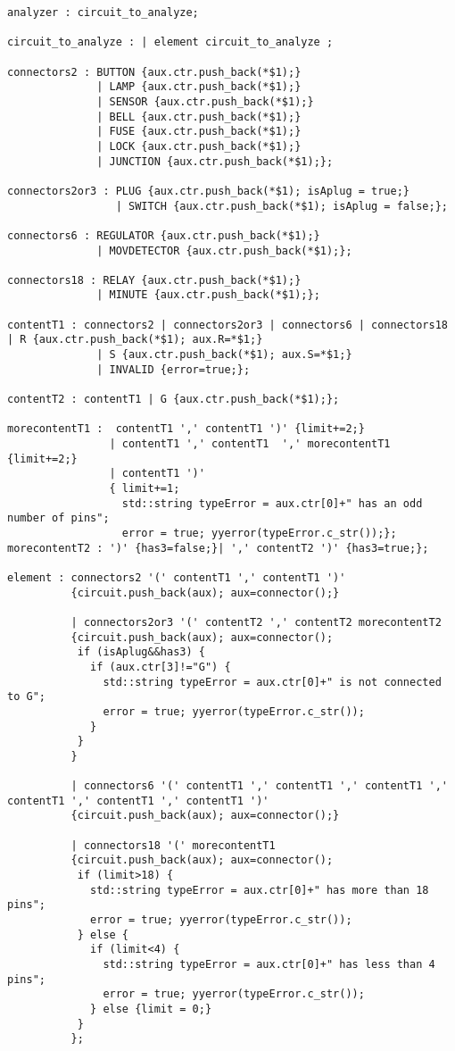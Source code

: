 \documentclass{article}
\begin{document}
\begin{verbatim}
analyzer : circuit_to_analyze;

circuit_to_analyze : | element circuit_to_analyze ;

connectors2 : BUTTON {aux.ctr.push_back(*$1);}
              | LAMP {aux.ctr.push_back(*$1);}
              | SENSOR {aux.ctr.push_back(*$1);}
              | BELL {aux.ctr.push_back(*$1);}
              | FUSE {aux.ctr.push_back(*$1);}
              | LOCK {aux.ctr.push_back(*$1);}
              | JUNCTION {aux.ctr.push_back(*$1);};

connectors2or3 : PLUG {aux.ctr.push_back(*$1); isAplug = true;}
                 | SWITCH {aux.ctr.push_back(*$1); isAplug = false;};

connectors6 : REGULATOR {aux.ctr.push_back(*$1);}
              | MOVDETECTOR {aux.ctr.push_back(*$1);};

connectors18 : RELAY {aux.ctr.push_back(*$1);}
              | MINUTE {aux.ctr.push_back(*$1);};

contentT1 : connectors2 | connectors2or3 | connectors6 | connectors18  | R {aux.ctr.push_back(*$1); aux.R=*$1;}
              | S {aux.ctr.push_back(*$1); aux.S=*$1;}
              | INVALID {error=true;};

contentT2 : contentT1 | G {aux.ctr.push_back(*$1);};

morecontentT1 :  contentT1 ',' contentT1 ')' {limit+=2;}
                | contentT1 ',' contentT1  ',' morecontentT1 {limit+=2;}
                | contentT1 ')'
                { limit+=1;
                  std::string typeError = aux.ctr[0]+" has an odd number of pins";
                  error = true; yyerror(typeError.c_str());};
morecontentT2 : ')' {has3=false;}| ',' contentT2 ')' {has3=true;};

element : connectors2 '(' contentT1 ',' contentT1 ')'
          {circuit.push_back(aux); aux=connector();}

          | connectors2or3 '(' contentT2 ',' contentT2 morecontentT2
          {circuit.push_back(aux); aux=connector();
           if (isAplug&&has3) {
             if (aux.ctr[3]!="G") {
               std::string typeError = aux.ctr[0]+" is not connected to G";
               error = true; yyerror(typeError.c_str());
             }
           }
          }

          | connectors6 '(' contentT1 ',' contentT1 ',' contentT1 ',' contentT1 ',' contentT1 ',' contentT1 ')'
          {circuit.push_back(aux); aux=connector();}

          | connectors18 '(' morecontentT1
          {circuit.push_back(aux); aux=connector();
           if (limit>18) {
             std::string typeError = aux.ctr[0]+" has more than 18 pins";
             error = true; yyerror(typeError.c_str());
           } else {
             if (limit<4) {
               std::string typeError = aux.ctr[0]+" has less than 4 pins";
               error = true; yyerror(typeError.c_str());
             } else {limit = 0;}
           }
          };
\end{verbatim}
\end{document}
